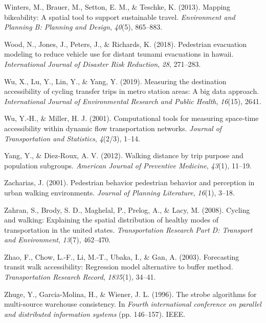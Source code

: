 \documentclass[
11pt, %
oneside, %
english, %
singlespacing, %
]{macthesis} %
\newlength{\cslhangindent}
\newenvironment{CSLReferences}[2] %
 {%
  \setlength{\parindent}{0pt}
  \ifodd #1 \everypar{\setlength{\hangindent}{\cslhangindent}}\ignorespaces\fi
  \ifnum #2 > 0
  \setlength{\parskip}{#2\baselineskip}
  \fi
 }%
 {}
\begin{document}
\begin{CSLReferences}{1}{0}
\leavevmode{}%
Winters, M., Brauer, M., Setton, E. M., \& Teschke, K. (2013). Mapping bikeability: A spatial tool to support sustainable travel. \emph{Environment and Planning B: Planning and Design}, \emph{40}(5), 865--883.

\leavevmode{}%
Wood, N., Jones, J., Peters, J., \& Richards, K. (2018). Pedestrian evacuation modeling to reduce vehicle use for distant tsunami evacuations in hawaii. \emph{International Journal of Disaster Risk Reduction}, \emph{28}, 271--283.

\leavevmode{}%
Wu, X., Lu, Y., Lin, Y., \& Yang, Y. (2019). Measuring the destination accessibility of cycling transfer trips in metro station areas: A big data approach. \emph{International Journal of Environmental Research and Public Health}, \emph{16}(15), 2641.

\leavevmode{}%
Wu, Y.-H., \& Miller, H. J. (2001). Computational tools for measuring space-time accessibility within dynamic flow transportation networks. \emph{Journal of Transportation and Statistics}, \emph{4}(2/3), 1--14.

\leavevmode{}%
Yang, Y., \& Diez-Roux, A. V. (2012). Walking distance by trip purpose and population subgroups. \emph{American Journal of Preventive Medicine}, \emph{43}(1), 11--19.

\leavevmode{}%
Zacharias, J. (2001). Pedestrian behavior pedestrian behavior and perception in urban walking environments. \emph{Journal of Planning Literature}, \emph{16}(1), 3--18.

\leavevmode{}%
Zahran, S., Brody, S. D., Maghelal, P., Prelog, A., \& Lacy, M. (2008). Cycling and walking: Explaining the spatial distribution of healthy modes of transportation in the united states. \emph{Transportation Research Part D: Transport and Environment}, \emph{13}(7), 462--470.

\leavevmode{}%
Zhao, F., Chow, L.-F., Li, M.-T., Ubaka, I., \& Gan, A. (2003). Forecasting transit walk accessibility: Regression model alternative to buffer method. \emph{Transportation Research Record}, \emph{1835}(1), 34--41.

\leavevmode{}%
Zhuge, Y., Garcia-Molina, H., \& Wiener, J. L. (1996). The strobe algorithms for multi-source warehouse consistency. In \emph{Fourth international conference on parallel and distributed information systems} (pp. 146--157). IEEE.


\end{CSLReferences}
\end{document}
